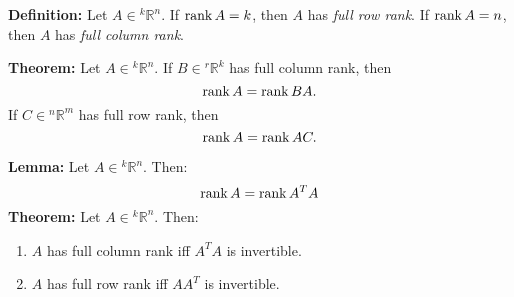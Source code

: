 \documentclass{article}
\begin{document}
    \hfill
    \begin{minipage}[t]{.45\textwidth} %
        \textbf{Definition:} Let $A \in {^k}\mathbb{R}^n$. If $\rank A = k$, then $A$ has \textit{full row rank}. If $\rank A = n$, then $A$ has \textit{full column rank}.
        \vspace{2mm}

        \textbf{Theorem:} Let $A\in {^k}\mathbb{R}^n$. If $B \in {^r}\mathbb{R}^k$ has full column rank, then $$\rank A = \rank BA.$$ If $C \in {^n}\mathbb{R}^m$ has full row rank, then $$\rank A = \rank AC.$$

        \textbf{Lemma:} Let $A \in {^k}\mathbb{R}^n$. Then:
        \begin{equation*}
            \rank A = \rank A^T A
        \end{equation*}
        \textbf{Theorem:} Let $A \in {^k}\mathbb{R}^n$. Then:
        \begin{enumerate}[label=(\alph*)]
            \item $A$ has full column rank iff $A^TA$ is invertible.
            \item $A$ has full row rank iff $AA^T$ is invertible.
        \end{enumerate}
    \end{minipage}
    \newpage
\end{document}
